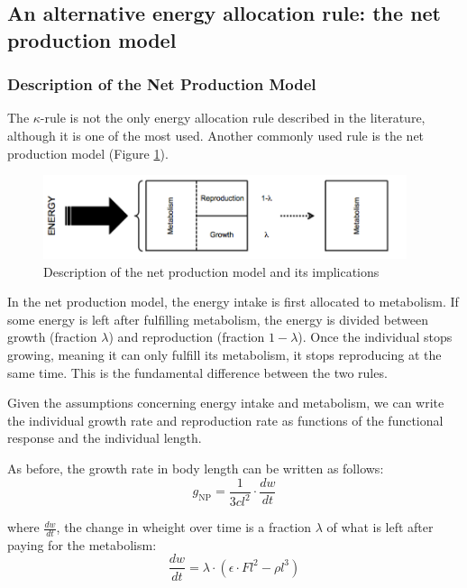 \subsection{An alternative energy allocation rule: the net production
model}\label{subsec:SupMat4}

\subsubsection{Description of the Net Production Model}

The $\kappa$-rule is not the only energy allocation rule described in the
literature, although it is one of the most used. Another commonly used rule is the net
production model (Figure \ref{Fig4-SM7}).

\begin{figure}[!ht] %
\centering
\includegraphics[width=0.95\textwidth]{4_ChapThe1/Fig/FigSM7}
\caption[Details of the Net
Production model]{Description of the net production model and its implications}
\label{Fig4-SM7}
\end{figure}

In the net production model, the energy intake is first allocated to metabolism.
If some energy is left after fulfilling metabolism, the energy is divided
between growth (fraction $\lambda$) and reproduction (fraction $1-\lambda$).
Once the individual stops growing, meaning it can only fulfill its metabolism, it stops
reproducing at the same time. This is the fundamental difference between the two
rules.

Given the assumptions concerning energy intake and metabolism, we can write the
individual growth rate and reproduction rate as functions of the functional
response and the individual length.

As before, the growth rate in body length can be written as follows:
\[
g_{\text{NP}}=\frac{1}{3cl^{2}}\cdot\frac{dw}{dt}
\]


where $\frac{dw}{dt}$, the change in wheight over time is a fraction
$\lambda$ of what is left after paying for the metabolism: 
\[
\frac{dw}{dt}=\lambda\cdot\left(\epsilon\cdot Fl^{2}-\rho l^{3}\right)
\]


